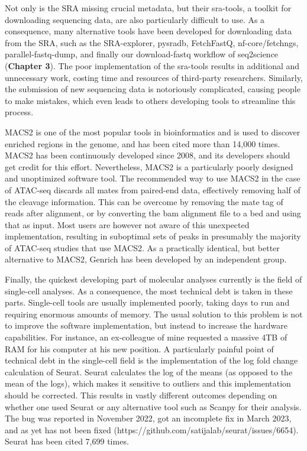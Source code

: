 Not only is the SRA missing crucial metadata, but their sra-tools, a toolkit for downloading sequencing data, are also particularly difficult to use. As a consequence, many alternative tools have been developed for downloading data from the SRA, such as the SRA-explorer\cite{sraexplorer}, pysradb\cite{pysradb}, FetchFastQ\cite{galvez2022metadata}, nf-core/fetchngs\cite{fetchngs}, parallel-fastq-dump\cite{parallelfastq}, and finally our download-fastq workflow of seq2science\cite{seq2science} (\textbf{Chapter 3}). The poor implementation of the sra-tools results in additional and unnecessary work, costing time and resources of third-party researchers. Similarly, the submission of new sequencing data is notoriously complicated, causing people to make mistakes, which even leads to others developing tools to streamline this process\cite{Quiones2020}. 

MACS2 is one of the most popular tools in bioinformatics and is used to discover enriched regions in the genome, and has been cited more than 14,000 times\cite{Zhang2008}. MACS2 has been continuously developed since 2008, and its developers should get credit for this effort. Nevertheless, MACS2 is a particularly poorly designed and unoptimized software tool. The recommended way to use MACS2 in the case of ATAC-seq discards all mates from paired-end data, effectively removing half of the cleavage information\cite{Gaspar2018}. This can be overcome by removing the mate tag of reads after alignment, or by converting the bam alignment file to a bed and using that as input. Most users are however not aware of this unexpected implementation, resulting in suboptimal sets of peaks in presumably the majority of ATAC-seq studies that use MACS2. As a practically identical, but better alternative to MACS2, Genrich has been developed by an independent group\cite{genrich}. 

Finally, the quickest developing part of molecular analyses currently is the field of single-cell analyses. As a consequence, the most technical debt is taken in these parts. Single-cell tools are usually implemented poorly, taking days to run and requiring enormous amounts of memory\cite{Pratapa_2020}. The usual solution to this problem is not to improve the software implementation, but instead to increase the hardware capabilities. For instance, an ex-colleague of mine requested a massive 4TB of RAM for his computer at his new position. A particularly painful point of technical debt in the single-cell field is the implementation of the log fold change calculation of Seurat. Seurat calculates the log of the means (as opposed to the mean of the logs), which makes it sensitive to outliers and this implementation should be corrected. This results in vastly different outcomes depending on whether one used Seurat or any alternative tool such as Scanpy for their analysis. The bug was reported in November 2022, got an incomplete fix in March 2023, and as yet has not been fixed (https://github.com/satijalab/seurat/issues/6654). Seurat has been cited 7,699 times.

